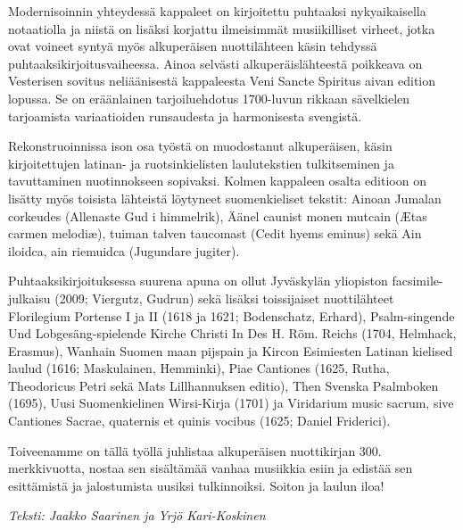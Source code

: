 Modernisoinnin yhteydessä kappaleet on kirjoitettu puhtaaksi nykyaikaisella notaatiolla ja niistä on lisäksi korjattu ilmeisimmät musiikilliset virheet, jotka ovat voineet syntyä myös alkuperäisen nuottilähteen käsin tehdyssä puhtaaksikirjoitusvaiheessa. Ainoa selvästi alkuperäislähteestä poikkeava on Vesterisen sovitus neliäänisestä kappaleesta Veni Sancte Spiritus aivan edition lopussa. Se on eräänlainen tarjoiluehdotus 1700-luvun rikkaan sävelkielen tarjoamista variaatioiden runsaudesta ja harmonisesta svengistä.

Rekonstruoinnissa ison osa työstä on muodostanut alkuperäisen, käsin kirjoitettujen latinan- ja ruotsinkielisten laulutekstien tulkitseminen ja tavuttaminen nuotinnokseen sopivaksi. Kolmen kappaleen osalta editioon on lisätty myös toisista lähteistä löytyneet suomenkieliset tekstit: Ainoan Jumalan corkeudes (Allenaste Gud i himmelrik), Äänel caunist monen mutcain (Ætas carmen melodiæ), tuiman talven taucomast (Cedit hyems eminus) sekä Ain iloidca, ain riemuidca (Jugundare jugiter).

Puhtaaksikirjoituksessa suurena apuna on ollut Jyväskylän yliopiston facsimile-julkaisu (2009; Viergutz, Gudrun) sekä lisäksi toissijaiset nuottilähteet Florilegium Portense I ja II (1618 ja 1621; Bodenschatz, Erhard), Psalm-singende Und Lobgesäng-spielende Kirche Christi In Des H. Röm. Reichs (1704, Helmhack, Erasmus), Wanhain Suomen maan pijspain ja Kircon Esimiesten Latinan kielised laulud (1616; Maskulainen, Hemminki), Piae Cantiones (1625, Rutha, Theodoricus Petri sekä Mats Lillhannuksen editio), Then Svenska Psalmboken (1695), Uusi Suomenkielinen Wirsi-Kirja (1701) ja Viridarium music sacrum, sive Cantiones Sacrae, quaternis et quinis vocibus (1625; Daniel Friderici).

Toiveenamme on tällä työllä juhlistaa alkuperäisen nuottikirjan 300. merkkivuotta, nostaa sen sisältämää vanhaa musiikkia esiin ja edistää sen esittämistä ja jalostumista uusiksi tulkinnoiksi. Soiton ja laulun iloa!

\textit{Teksti: Jaakko Saarinen ja Yrjö Kari-Koskinen}
